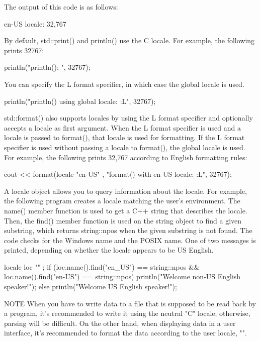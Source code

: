 The output of this code is as follows:

\begin{shell}
en-US locale: 32,767
\end{shell}

By default, std::print() and println() use the C locale. For example, the following prints 32767:

\begin{cpp}
println("println(): {}", 32767);
\end{cpp}

You can specify the L format specifier, in which case the global locale is used.

\begin{cpp}
println("println() using global locale: {:L}", 32767);
\end{cpp}

std::format() also supports locales by using the L format specifier and optionally accepts a locale as first argument. When the L format specifier is used and a locale is passed to format(), that locale is used for formatting. If the L format specifier is used without passing a locale to format(), the global locale is used. For example, the following prints 32,767 according to English formatting rules:

\begin{cpp}
cout << format(locale { "en-US" }, "format() with en-US locale: {:L}", 32767);
\end{cpp}

A locale object allows you to query information about the locale. For example, the following program creates a locale matching the user’s environment. The name() member function is used to get a C++ string that describes the locale. Then, the find() member function is used on the string object to find a given substring, which returns string::npos when the given substring is not found. The code checks for the Windows name and the POSIX name. One of two messages is printed, depending on whether the locale appears to be US English.

\begin{cpp}
locale loc { "" };
if (loc.name().find("en_US") == string::npos &&
    loc.name().find("en-US") == string::npos) {
    println("Welcome non-US English speaker!");
} else {
    println("Welcome US English speaker!");
}
\end{cpp}

\begin{myNotic}{NOTE}
When you have to write data to a file that is supposed to be read back by a program, it’s recommended to write it using the neutral "C" locale; otherwise, parsing will be difficult. On the other hand, when displaying data in a user interface, it’s recommended to format the data according to the user locale, "".
\end{myNotic}


